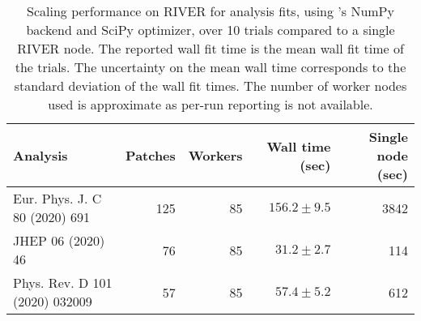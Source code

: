 \begin{table}[htpb]
\centering
\caption{Scaling performance on RIVER for analysis fits, using \pyhf{}'s NumPy backend and SciPy optimizer, over 10 trials compared to a single RIVER node. The reported wall fit time is the mean wall fit time of the trials. The uncertainty on the mean wall time corresponds to the standard deviation of the wall fit times. The number of worker nodes used is approximate as per-run reporting is not available.}
\label{table:performance}
\begin{tabular}{@{}lrrrr@{}}
\toprule
                      Analysis & Patches & Workers & Wall time (sec) & Single node (sec) \\
\midrule
 Eur. Phys. J. C 80 (2020) 691 &     125 &      85 &   $156.2\pm9.5$ &              3842 \\
             JHEP 06 (2020) 46 &      76 &      85 &    $31.2\pm2.7$ &               114 \\
Phys. Rev. D 101 (2020) 032009 &      57 &      85 &    $57.4\pm5.2$ &               612 \\
\bottomrule
\end{tabular}
\end{table}
